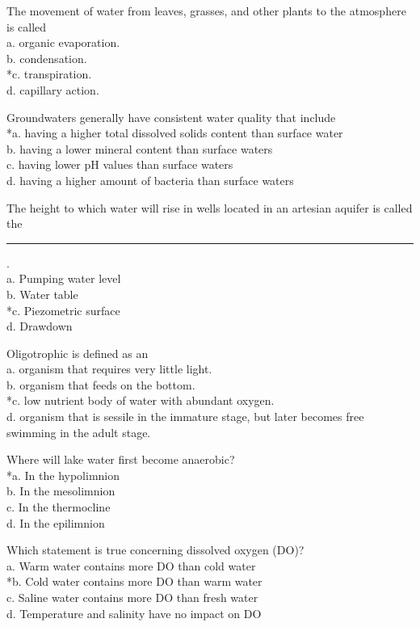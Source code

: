   \item The movement of water from leaves, grasses, and other plants to the atmosphere is called\\
a. organic evaporation.\\
b. condensation.\\
*c. transpiration.\\
d. capillary action.\\

  \item Groundwaters generally have consistent water quality that include\\
*a. having a higher total dissolved solids content than surface water\\
b. having a lower mineral content than surface waters\\
c. having lower $\mathrm{pH}$ values than surface waters\\
d. having a higher amount of bacteria than surface waters\\


\item The height to which water will rise in wells located in an artesian aquifer is called the \rule{1.5cm}{0.5pt}.\\
a.	Pumping water level\\
b.	Water table\\
*c.	Piezometric surface\\
d.	Drawdown\\

\item Oligotrophic is defined as an\\

a. organism that requires very little light.\\
b. organism that feeds on the bottom.\\
*c. low nutrient body of water with abundant oxygen.\\
d. organism that is sessile in the immature stage, but later becomes free swimming in the adult stage.\\


  \item Where will lake water first become anaerobic?\\
*a. In the hypolimnion\\
b. In the mesolimnion\\
c. In the thermocline\\
d. In the epilimnion\\

  \item Which statement is true concerning dissolved oxygen (DO)?\\
a. Warm water contains more DO than cold water\\
*b. Cold water contains more DO than warm water\\
c. Saline water contains more DO than fresh water\\
d. Temperature and salinity have no impact on DO\\


